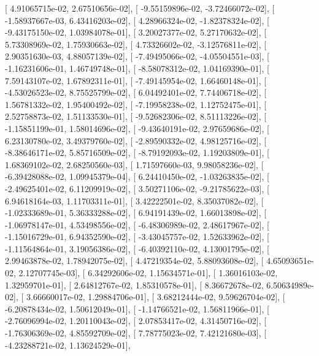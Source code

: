 \documentclass{article}
\begin{document}
       [  4.91065715e-02,   2.67510656e-02],
       [ -9.55159896e-02,  -3.72466072e-02],
       [ -1.58937667e-03,   6.43416203e-02],
       [  4.28966324e-02,  -1.82378324e-02],
       [ -9.43175150e-02,   1.03984078e-01],
       [  3.20027377e-02,   5.27170632e-02],
       [  5.73308969e-02,   1.75930663e-02],
       [  4.73326602e-02,  -3.12576811e-02],
       [  2.90351630e-03,   4.88057139e-02],
       [ -7.49495066e-02,  -4.05504551e-03],
       [ -1.16231606e-01,   1.46749748e-01],
       [ -8.58078312e-02,   1.04169390e-01],
       [  7.59143107e-02,   1.67892311e-01],
       [ -7.49145954e-02,   1.66460148e-01],
       [ -4.53026523e-02,   8.75525799e-02],
       [  6.04492401e-02,   7.74406718e-02],
       [  1.56781332e-02,   1.95400492e-02],
       [ -7.19958238e-02,   1.12752475e-01],
       [  2.52758873e-02,   1.51133530e-01],
       [ -9.52682306e-02,   8.51113226e-02],
       [ -1.15851199e-01,   1.58014696e-02],
       [ -9.43640191e-02,   2.97659686e-02],
       [  6.23130780e-02,   3.49379760e-02],
       [ -2.89590332e-02,   4.98125716e-02],
       [ -8.38646171e-02,   5.85716509e-02],
       [ -8.79192093e-02,   1.19203809e-01],
       [  1.68369102e-02,   2.68250560e-03],
       [  1.71597660e-03,   9.98058236e-02],
       [ -6.39428088e-02,   1.09945379e-04],
       [  6.24410450e-02,  -1.03263835e-02],
       [ -2.49625401e-02,   6.11209919e-02],
       [  3.50271106e-02,  -9.21785622e-03],
       [  6.94618164e-03,   1.11703311e-01],
       [  3.42222501e-02,   8.35037082e-02],
       [ -1.02333689e-01,   5.36333288e-02],
       [  6.94191439e-02,   1.66013898e-02],
       [ -1.06978147e-01,   4.53498556e-02],
       [ -6.48306989e-02,   2.48617967e-02],
       [ -1.15016729e-01,   6.94352590e-02],
       [ -3.43045757e-02,   1.52633962e-02],
       [ -1.11564864e-01,   3.19056386e-02],
       [ -6.40392110e-02,   4.13001795e-02],
       [  2.99463878e-02,   1.78942075e-02],
       [  4.47219354e-02,   5.88093608e-02],
       [  4.65093651e-02,   2.12707745e-03],
       [  6.34292606e-02,   1.15634571e-01],
       [  1.36016103e-02,   1.32959701e-01],
       [  2.64812767e-02,   1.85310578e-01],
       [  8.36672678e-02,   6.50634989e-02],
       [  3.66660017e-02,   1.29884706e-01],
       [  3.68212444e-02,   9.59626704e-02],
       [ -6.20878434e-02,   1.50612049e-01],
       [ -1.14766521e-02,   1.56811966e-01],
       [ -2.76096994e-02,   1.20110043e-02],
       [  2.07853417e-02,   4.31450716e-02],
       [ -1.76306369e-02,   4.85592709e-02],
       [  7.78775023e-02,   7.42121680e-03],
       [ -4.23288721e-02,   1.13624529e-01],
\end{document}
